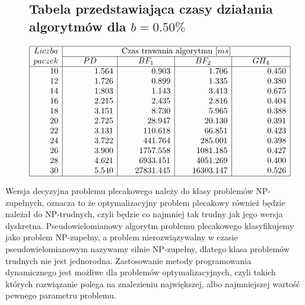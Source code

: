 \documentclass[polish,polish,a4paper]{article}
\begin{document}
\begin{spacing}{1.35}
\begin{figure}[H]
{		\subsection*{Tabela przedstawiająca czasy działania algorytmów dla $b=0.50\%$}}
	\begin{spacing}{1.7}
	\begin{equation*}
	\begin{array}{|r|r|r|r|r|}
	\hline
	\multicolumn{1}{|c|}{Liczba}&\multicolumn{4}{c|}{$Czas trawania algorytmu $[ms]}\\\cline{2-5}
	\multicolumn{1}{|c|}{paczek}&\multicolumn{1}{c|}{\quad \quad PD\quad \quad  }&\multicolumn{1}{c|}{ \quad \quad BF_{1}\quad \quad  }&\multicolumn{1}{c|}{ \quad \quad BF_{2}\quad \quad }&\multicolumn{1}{c|}{\quad \quad  GH_{4}\quad \quad  }\\
	\hline
	10&1.564&0.903&1.706&0.450\\
	12&1.726&0.899&1.335&0.380\\
	14&1.803&1.143&3.413&0.675\\
	16&2.215&2.435&2.816&0.404\\
	18&3.151&8.730&5.965&0.388\\
	20&2.725&28.947&20.130&0.391\\
	22&3.131&110.618&66.851&0.423\\
	24&3.722&441.764&285.001&0.398\\
	26&3.900&1757.558&1081.185&0.427\\
	28&4.621&6933.151&4051.269&0.400\\
	30&5.540&27831.445&16303.147&0.526\\
	\hline
	\end{array}
	\end{equation*}
\end{spacing}
\end{figure}

	Wersja decyzyjna problemu plecakowego należy do klasy problemów NP-zupełnych, oznacza to że optymalizacyjny problem plecakowy również będzie należał do NP-trudnych, czyli będzie co najmniej tak trudny jak jego wersja dyskretna. Pseudowielomianowy algorytm problemu plecakowego klasyfikujemy jako problem NP-zupełny, a problem nierozwiązywalny w czasie
	pseudowielomianowym nazywamy silnie NP-zupełny, dlatego klasa problemów trudnych nie jest jednorodna.  Zastosowanie metody programowania dynamicznego jest możliwe dla problemów optymalizacyjnych, czyli takich których rozwiązanie polega na znalezieniu największej, albo najmniejszej wartość pewnego parametru problemu.
	

\end{spacing}
\end{document}

